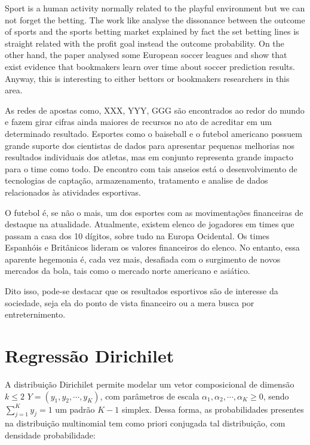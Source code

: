 \documentclass[review]{elsarticle}
\begin{document}
Sport is a human activity normally related to the playful environment but we can not forget the betting. The work like \cite{Kain2014} analyse the dissonance between the outcome of sports and the sports betting market explained by fact the set betting lines is straight related with the profit goal instead the outcome probability. On the other hand, the  paper \cite{Strumbelj2010} analysed  some European soccer leagues and show that exist evidence that bookmakers learn over time about soccer prediction results. Anyway, this is interesting to either bettors or bookmakers researchers in this area.


As redes de apostas como, XXX, YYY, GGG são encontrados ao redor do mundo e fazem girar cifras ainda maiores de recursos no ato de acreditar em um determinado resultado. Esportes como o baiseball e o futebol americano possuem grande suporte dos cientistas de dados para apresentar pequenas melhorias nos resultados individuais dos atletas, mas em conjunto representa grande impacto para o time como todo. De encontro com tais anseios está o desenvolvimento de tecnologias de captação, armazenamento, tratamento e analise de dados relacionados às atividades esportivas.

O futebol é, se não o mais, um dos esportes com as movimentações financeiras de destaque na atualidade. Atualmente, existem elenco de jogadores em times que passam a casa dos 10 dígitos, sobre tudo na Europa Ocidental. Os times Espanhóis e Britânicos lideram os valores financeiros do elenco. No entanto, essa aparente hegemonia é, cada vez mais, desafiada com o surgimento de novos mercados da bola, tais como o mercado norte americano e asiático.



Dito isso, pode-se destacar que os resultados esportivos são de interesse da sociedade, seja ela do ponto de vista financeiro ou a mera busca por entreternimento.




\section{Regressão Dirichilet}
\label{sec:mod}
\noindent



A distribuição Dirichilet permite modelar um vetor composicional de dimensão $k\leq 2$ $Y = (y_1,y_2,\cdots,y_K)$, com parâmetros de escala $\alpha_1,\alpha_2,\cdots,\alpha_K\geq 0$, sendo $\sum_{j=1}^K y_j = 1$ um padrão $K-1$ simplex. Dessa forma, as probabilidades presentes na distribuição multinomial tem como priori conjugada tal distribuição, com densidade probabilidade:
\end{document}

